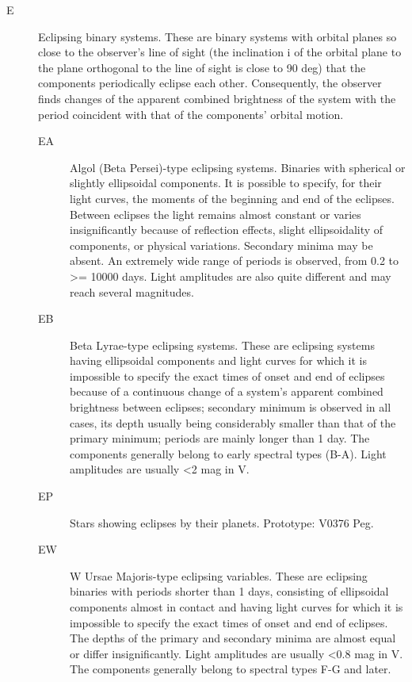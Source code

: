 \begin{description}
\item[E]      Eclipsing binary systems. These are binary systems with
              orbital planes so close to the observer's line of sight (the inclination
              i of the orbital plane to the plane orthogonal to the line of sight is
              close to 90 deg) that the components periodically eclipse each other.
              Consequently, the observer finds changes of the apparent combined
              brightness of the system with the period coincident with that of the
              components' orbital motion.
	\begin{description}
\item[EA]     Algol (Beta Persei)-type eclipsing systems. Binaries with
              spherical or slightly ellipsoidal components. It is possible to specify,
              for their light curves, the moments of the beginning and end of the
              eclipses. Between eclipses the light remains almost constant or varies
              insignificantly because of reflection effects, slight ellipsoidality of
              components, or physical variations. Secondary minima may be absent. An
              extremely wide range of periods is observed, from 0.2 to \textgreater{}=
              10000 days. Light amplitudes are also quite different and may reach
              several magnitudes.
\item[EB]     Beta Lyrae-type eclipsing systems. These are eclipsing
              systems having ellipsoidal components and light curves for which it is
              impossible to specify the exact times of onset and end of eclipses
              because of a continuous change of a system's apparent combined
              brightness between eclipses; secondary minimum is observed in all cases,
              its depth usually being considerably smaller than that of the primary
              minimum; periods are mainly longer than 1 day. The components generally
              belong to early spectral types (B-A). Light amplitudes are usually
              \textless{}2 mag in V.
\item[EP]     Stars showing eclipses by their planets. Prototype: V0376 Peg.
\item[EW]     W Ursae Majoris-type eclipsing variables. These are
              eclipsing binaries with periods shorter than 1 days, consisting of ellipsoidal
              components almost in contact and having light curves for which it is
              impossible to specify the exact times of onset and end of eclipses. The
              depths of the primary and secondary minima are almost equal or differ
              insignificantly. Light amplitudes are usually \textless{}0.8 mag in V.
              The components generally belong to spectral types F-G and
              later.
	\end{description}
\end{description}

